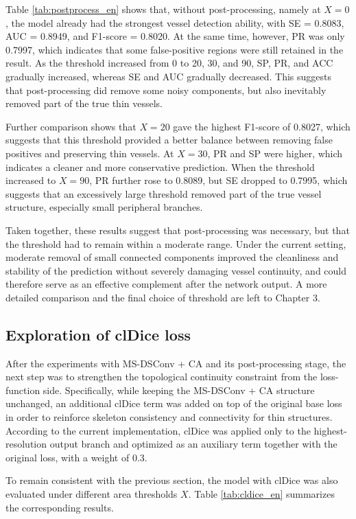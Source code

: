 \documentclass[a4paper,12pt]{article}
\begin{document}
Table \ref{tab:postprocess_en} shows that, without post-processing, namely at \(X=0\), the model already had the strongest vessel detection ability, with SE = 0.8083, AUC = 0.8949, and F1-score = 0.8020. At the same time, however, PR was only 0.7997, which indicates that some false-positive regions were still retained in the result. As the threshold increased from 0 to 20, 30, and 90, SP, PR, and ACC gradually increased, whereas SE and AUC gradually decreased. This suggests that post-processing did remove some noisy components, but also inevitably removed part of the true thin vessels.

Further comparison shows that \(X=20\) gave the highest F1-score of 0.8027, which suggests that this threshold provided a better balance between removing false positives and preserving thin vessels. At \(X=30\), PR and SP were higher, which indicates a cleaner and more conservative prediction. When the threshold increased to \(X=90\), PR further rose to 0.8089, but SE dropped to 0.7995, which suggests that an excessively large threshold removed part of the true vessel structure, especially small peripheral branches.

Taken together, these results suggest that post-processing was necessary, but that the threshold had to remain within a moderate range. Under the current setting, moderate removal of small connected components improved the cleanliness and stability of the prediction without severely damaging vessel continuity, and could therefore serve as an effective complement after the network output. A more detailed comparison and the final choice of threshold are left to Chapter 3.

\subsection{Exploration of clDice loss}

After the experiments with MS-DSConv + CA and its post-processing stage, the next step was to strengthen the topological continuity constraint from the loss-function side. Specifically, while keeping the MS-DSConv + CA structure unchanged, an additional clDice term was added on top of the original base loss in order to reinforce skeleton consistency and connectivity for thin structures. According to the current implementation, clDice was applied only to the highest-resolution output branch and optimized as an auxiliary term together with the original loss, with a weight of 0.3.

To remain consistent with the previous section, the model with clDice was also evaluated under different area thresholds \(X\). Table \ref{tab:cldice_en} summarizes the corresponding results.
\end{document}
